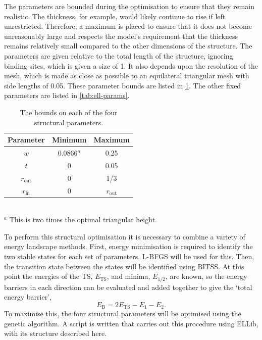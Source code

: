 The parameters are bounded during the optimisation to ensure that they remain realistic.
The thickness, for example, would likely continue to rise if left unrestricted.
Therefore, a maximum is placed to ensure that it does not become unreasonably large and respects the model's requirement that the thickness remains relatively small compared to the other dimensions of the structure.
The parameters are given relative to the total length of the structure, ignoring binding sites, which is given a size of 1.
It also depends upon the resolution of the mesh, which is made as close as possible to an equilateral triangular mesh with side lengths of 0.05.
These parameter bounds are listed in \cref{tab:ell-structbounds}.
The other fixed parameters are listed in \cref{tab:ell-params}.

\begin{table}[htb]
  \begin{tabularx}{0.5\textwidth}{ccc}
    \hline\hline
    Parameter      & Minimum & Maximum \\
    \hline
    $w$            & 0.0866$^a$ & 0.25 \\
    $t$            & 0       & 0.05 \\
    $r_\text{out}$ & 0       & 1/3 \\
    $r_\text{in}$  & 0       & $r_\text{out}$ \\
    \hline\hline
  \end{tabularx}
  \footnotesize{\\$^a$ This is two times the optimal triangular height.}
  \caption{\label{tab:ell-structbounds}
    The bounds on each of the four structural parameters.
  }
\end{table}

To perform this structural optimisation it is necessary to combine a variety of energy landscape methods.
First, energy minimisation is required to identify the two stable states for each set of parameters.
L-BFGS will be used for this.
Then, the transition state between the states will be identified using BITSS.
At this point the energies of the TS, $E_\text{TS}$, and minima, $E_{1/2}$, are known, so the energy barriers in each direction can be evaluated and added together to give the `total energy barrier',
\begin{equation}
  E_\text{B} = 2E_\text{TS} - E_1 - E_2.
  \label{eq:ell-totbarrier}
\end{equation}
To maximise this, the four structural parameters will be optimised using the genetic algorithm.
A script is written that carries out this procedure using ELLib, with its structure described here.

